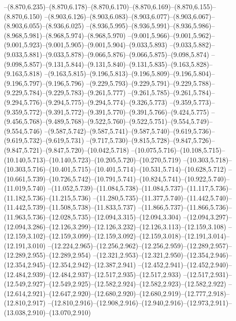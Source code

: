   --(8.870,6.235)--(8.870,6.178)--(8.870,6.170)--(8.870,6.169)--(8.870,6.155)--(8.870,6.150)%
  --(8.903,6.126)--(8.903,6.083)--(8.903,6.077)--(8.903,6.067)--(8.903,6.055)--(8.936,6.025)%
  --(8.936,5.995)--(8.936,5.991)--(8.936,5.986)--(8.968,5.981)--(8.968,5.974)--(8.968,5.970)%
  --(9.001,5.966)--(9.001,5.962)--(9.001,5.923)--(9.001,5.905)--(9.001,5.904)--(9.033,5.893)%
  --(9.033,5.882)--(9.033,5.881)--(9.033,5.878)--(9.066,5.876)--(9.066,5.875)--(9.098,5.874)%
  --(9.098,5.857)--(9.131,5.844)--(9.131,5.840)--(9.131,5.835)--(9.163,5.828)--(9.163,5.818)%
  --(9.163,5.815)--(9.196,5.813)--(9.196,5.809)--(9.196,5.804)--(9.196,5.797)--(9.196,5.796)%
  --(9.229,5.793)--(9.229,5.791)--(9.229,5.788)--(9.229,5.784)--(9.229,5.783)--(9.261,5.777)%
  --(9.261,5.785)--(9.261,5.784)--(9.294,5.776)--(9.294,5.775)--(9.294,5.774)--(9.326,5.773)%
  --(9.359,5.773)--(9.359,5.772)--(9.391,5.772)--(9.391,5.770)--(9.391,5.766)--(9.424,5.775)%
  --(9.456,5.768)--(9.489,5.768)--(9.522,5.760)--(9.522,5.751)--(9.554,5.749)--(9.554,5.746)%
  --(9.587,5.742)--(9.587,5.741)--(9.587,5.740)--(9.619,5.736)--(9.619,5.732)--(9.619,5.731)%
  --(9.717,5.730)--(9.815,5.728)--(9.847,5.726)--(9.847,5.721)--(9.847,5.720)--(10.042,5.718)%
  --(10.075,5.716)--(10.108,5.715)--(10.140,5.713)--(10.140,5.723)--(10.205,5.720)--(10.270,5.719)%
  --(10.303,5.718)--(10.303,5.716)--(10.401,5.715)--(10.401,5.714)--(10.531,5.714)--(10.628,5.712)%
  --(10.661,5.739)--(10.726,5.742)--(10.791,5.741)--(10.824,5.741)--(10.922,5.740)--(11.019,5.740)%
  --(11.052,5.739)--(11.084,5.738)--(11.084,5.737)--(11.117,5.736)--(11.182,5.736)--(11.215,5.736)%
  --(11.280,5.735)--(11.377,5.740)--(11.442,5.740)--(11.442,5.739)--(11.508,5.738)--(11.833,5.737)%
  --(11.866,5.737)--(11.866,5.736)--(11.963,5.736)--(12.028,5.735)--(12.094,3.315)--(12.094,3.304)%
  --(12.094,3.297)--(12.094,3.286)--(12.126,3.299)--(12.126,3.232)--(12.126,3.113)--(12.159,3.108)%
  --(12.159,3.102)--(12.159,3.099)--(12.159,3.092)--(12.159,3.018)--(12.191,3.014)--(12.191,3.010)%
  --(12.224,2.965)--(12.256,2.962)--(12.256,2.959)--(12.289,2.957)--(12.289,2.955)--(12.289,2.954)%
  --(12.321,2.953)--(12.321,2.950)--(12.354,2.946)--(12.354,2.945)--(12.354,2.942)--(12.387,2.941)%
  --(12.452,2.941)--(12.452,2.940)--(12.484,2.939)--(12.484,2.937)--(12.517,2.935)--(12.517,2.933)%
  --(12.517,2.931)--(12.549,2.927)--(12.549,2.925)--(12.582,2.924)--(12.582,2.923)--(12.582,2.922)%
  --(12.614,2.921)--(12.647,2.920)--(12.680,2.920)--(12.680,2.919)--(12.777,2.918)--(12.810,2.917)%
  --(12.810,2.916)--(12.908,2.916)--(12.940,2.916)--(12.973,2.911)--(13.038,2.910)--(13.070,2.910)%
